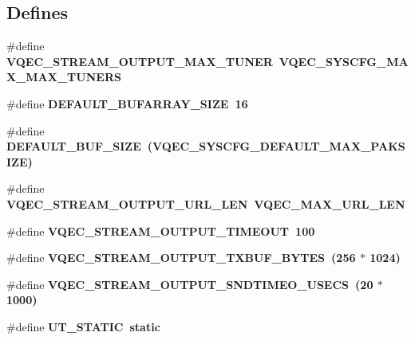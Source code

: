 \subsection*{Defines}
\begin{CompactItemize}
\item 
\#define \bf{VQEC\_\-STREAM\_\-OUTPUT\_\-MAX\_\-TUNER}~VQEC\_\-SYSCFG\_\-MAX\_\-MAX\_\-TUNERS
\item 
\#define \bf{DEFAULT\_\-BUFARRAY\_\-SIZE}~16
\item 
\#define \bf{DEFAULT\_\-BUF\_\-SIZE}~(VQEC\_\-SYSCFG\_\-DEFAULT\_\-MAX\_\-PAKSIZE)
\item 
\#define \bf{VQEC\_\-STREAM\_\-OUTPUT\_\-URL\_\-LEN}~VQEC\_\-MAX\_\-URL\_\-LEN
\item 
\#define \bf{VQEC\_\-STREAM\_\-OUTPUT\_\-TIMEOUT}~100
\item 
\#define \bf{VQEC\_\-STREAM\_\-OUTPUT\_\-TXBUF\_\-BYTES}~(256 $\ast$ 1024)
\item 
\#define \bf{VQEC\_\-STREAM\_\-OUTPUT\_\-SNDTIMEO\_\-USECS}~(20 $\ast$ 1000)
\item 
\#define \bf{UT\_\-STATIC}~static
\end{CompactItemize}
